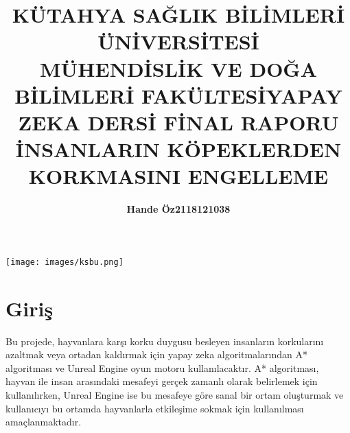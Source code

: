 \documentclass[12pt,a4paper]{article}
\title{\bf\fontsize{12pt}{14pt}\selectfont KÜTAHYA SAĞLIK BİLİMLERİ ÜNİVERSİTESİ \\ MÜHENDİSLİK VE DOĞA BİLİMLERİ FAKÜLTESİ}
\begin{document}
	\maketitle
	\thispagestyle{empty}
	\begin{center}
		\texttt{[image: images/ksbu.png]}
	\end{center}
	\begin{center}
		\vspace{1cm} %
	\end{center}
	\begin{center}
		\title{\bf\fontsize{12pt}{14pt}\selectfont YAPAY ZEKA DERSİ FİNAL RAPORU }
	\end{center}
	\begin{center}
		\title{\bf\fontsize{12pt}{14pt}\selectfont İNSANLARIN KÖPEKLERDEN KORKMASINI ENGELLEME}
	\end{center}
	\begin{center}
		\vspace{1cm} %
	\end{center}
	\begin{center}
		
		\author{\bf\fontsize{12pt}{14pt}Hande Öz\hspace{1.5cm}2118121038}
		
		\begin{center}
			\vspace{1cm} %
		\end{center}
		\begin{center}
			\vspace{1cm} %
		\end{center}
	\end{center}
	
	\section{Giriş} 
		Bu projede, hayvanlara karşı korku duygusu besleyen insanların korkularını azaltmak veya ortadan kaldırmak için yapay zeka algoritmalarından A* algoritması ve Unreal Engine oyun motoru kullanılacaktır. A* algoritması, hayvan ile insan arasındaki mesafeyi gerçek zamanlı olarak belirlemek için kullanılırken, Unreal Engine ise bu mesafeye göre sanal bir ortam oluşturmak ve kullanıcıyı bu ortamda hayvanlarla etkileşime sokmak için kullanılması amaçlanmaktadır.
		
\end{document}
